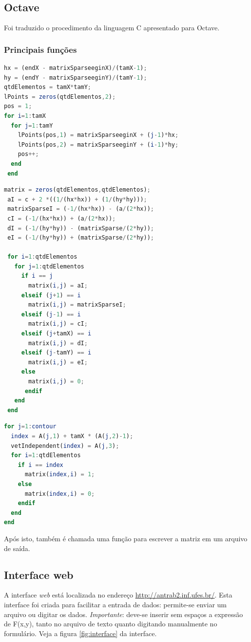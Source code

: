 \documentclass[
	11pt,				%
	oneside,			%
	a4paper,			%
	english,			%
	brazil,				%
	]{article}
\begin{document}
\subsection{Octave}
Foi traduzido o procedimento da linguagem C apresentado para Octave.

\subsubsection{Principais funções}

\begin{lstlisting}[language=Octave, caption=Função Discretiza]
hx = (endX - matrixSparseeginX)/(tamX-1);
hy = (endY - matrixSparseeginY)/(tamY-1);
qtdElementos = tamX*tamY;
lPoints = zeros(qtdElementos,2);
pos = 1;
for i=1:tamX
  for j=1:tamY
    lPoints(pos,1) = matrixSparseeginX + (j-1)*hx;
    lPoints(pos,2) = matrixSparseeginY + (i-1)*hy;
    pos++;
  end
 end
\end{lstlisting}

\begin{lstlisting}[language=Octave, caption=Função Cria Matriz]
 matrix = zeros(qtdElementos,qtdElementos);
 aI = c + 2 *((1/(hx*hx)) + (1/(hy*hy)));
 matrixSparseI = (-1/(hx*hx)) - (a/(2*hx));
 cI = (-1/(hx*hx)) + (a/(2*hx));
 dI = (-1/(hy*hy)) - (matrixSparse/(2*hy));
 eI = (-1/(hy*hy)) + (matrixSparse/(2*hy));

 for i=1:qtdElementos
   for j=1:qtdElementos
     if i == j
       matrix(i,j) = aI;
     elseif (j+1) == i
       matrix(i,j) = matrixSparseI;
     elseif (j-1) == i
       matrix(i,j) = cI;
     elseif (j+tamX) == i
       matrix(i,j) = dI;
     elseif (j-tamY) == i
       matrix(i,j) = eI;
     else
       matrix(i,j) = 0;
      endif
   end
 end
\end{lstlisting}

\begin{lstlisting}[language=Octave, caption=Função Insere Contorno]
for j=1:contour
  index = A(j,1) + tamX * (A(j,2)-1);
  vetIndependent(index) = A(j,3);
  for i=1:qtdElementos
    if i == index
      matrix(index,i) = 1;
    else
      matrix(index,i) = 0;
    endif
  end
end
\end{lstlisting}

Após isto, também é chamada uma função para escrever a matriz em um arquivo de saída.

\subsection{Interface web}
A interface \textit{web} está localizada no endereço \url{http://antrab2.inf.ufes.br/}. Esta interface foi criada para facilitar a entrada de dados: permite-se enviar um arquivo ou digitar os dados. \textit{Importante}: deve-se inserir sem espaços a expressão de F(x,y), tanto no arquivo de texto quanto digitando manualmente no formulário. Veja a figura \ref{fig:interface} da interface.
\end{document}
